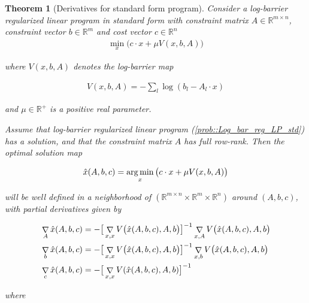 \documentclass[12pt]{article}
\newcommand{\R}{\mathbb{R}}
\DeclareMathOperator{\grad}{\mathop{\nabla}}
\DeclareMathOperator*{\argmin}{arg\,min}
\newcommand{\dotprod}[2]{#1\mathbin{\cdot}#2}
\newcommand{\pa}[1]{\left( #1 \right)}
\newcommand{\bpa}[1]{\big( #1 \big)}
\newcommand{\bbr}[1]{\big[ #1 \big]}
\newtheorem{theorem}{Theorem}
\begin{document}
\begin{theorem}[Derivatives for standard form program]
    \label{thm::Std_form_derivatives}
Consider a log-barrier regularized linear program in standard form with constraint matrix $A \in \R^{m \times n}$, 
constraint vector $b \in \R^{m}$ and cost vector $c \in \R^{n}$ 
\begin{align}
    \label{prob::Log_bar_reg_LP_std}
    \min_x \bpa{\dotprod{c}{x} + \mu V(x, b, A)}
\end{align}

where $V(x,b,A)$ denotes the log-barrier map 

\begin{align}
    \label{eq::log_barrier_map}
    V(x,b,A) = -\sum_l\log\pa{b_l - \dotprod{A_l}{x}} 
\end{align}

and $\mu \in \R^+$ is a positive real parameter.

Assume that log-barrier regularized linear program (\ref{prob::Log_bar_reg_LP_std}) has a solution, 
and that the constraint matrix $A$ has full row-rank. Then the optimal solution map

\begin{align}
    \label{eq::optimal_solution_map}
    \xopt = \argmin_x \bpa{\dotprod{c}{x} + \mu V(x, b, A)}
\end{align}

will be well defined in a neighborhood of $(\R^{m\times n} \times \R^{m} \times \R^{n} )$ around  $(A, b, c)$,
with partial derivatives given by

\begin{subequations}
\label{eq::Main_result}


\begin{align}
    \label{eq::std_constraint_matrix_derivative}
    & \grad_A \xopt = - \bbr{\grad_{x,x}V\bpa{\xopt, A, b}}^{-1}\grad_{x, A}V\bpa{\xopt, A, b} \\
    \label{eq::std_constraint_vector_derivative}
    & \grad_b \xopt = - \bbr{\grad_{x,x}V\bpa{\xopt, A, b}}^{-1} \grad_{x, b}V\bpa{\xopt, A, b}\\
    \label{eq::std_cost_vector_derivative}
    & \grad_c \xopt = -  \bbr{\grad_{x,x}V(\xopt, A, b)}^{-1}
\end{align}
\end{subequations}

where 


\end{theorem}
\end{document}
